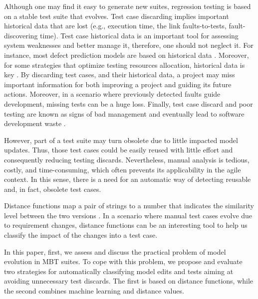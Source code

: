 Although one may find it easy to generate new suites, regression testing is based on a stable test suite that evolves. Test case discarding implies important historical data that are lost (e.g., execution time, the link faults-to-tests, fault-discovering time). Test case historical data is an important tool for assessing system weaknesses and better manage it, therefore, one should not neglect it. For instance, most defect prediction models are based on historical data \citep{he2012investigation}. Moreover, for some strategies that optimize testing resources allocation, historical data is key \citep{noor2015similarity,anderson2014improving}. By discarding test cases, and their historical data, a project may miss important information for both improving a project and guiding its future actions. Moreover, in a scenario where previously detected faults guide development, missing tests can be a huge loss. Finally, test case discard and poor testing are known as signs of bad management and eventually lead to software development
waste \citep{sedano2017software}.


However, part of a test suite may turn obsolete due to little impacted model updates. Thus, those test cases could be easily reused with little effort and consequently reducing testing discards. Nevertheless, manual analysis is tedious, costly, and time-consuming, which often prevents its applicability in the agile context. In this sense, there is a need for an automatic way of detecting reusable and, in fact, obsolete test cases. 


Distance functions map a pair of strings to a number that indicates the similarity level between the two versions \citep{cohen2003distance}. In a scenario where manual test cases evolve due to requirement changes, distance functions can be an interesting tool to help us classify the impact of the changes into a test case.

In this paper, first, we assess and discuss the practical problem of model evolution in MBT suites. To cope with this problem, we propose and evaluate two strategies for automatically classifying model edits and tests aiming at avoiding unnecessary test discards. The first is based on distance functions, while the second combines machine learning and distance values.

